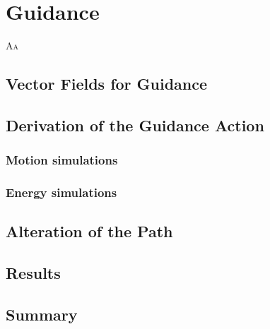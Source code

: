 
\chapter{Guidance}
\label{cp:gd}


\lettrine{A}{a}


\section{Vector Fields for Guidance}


\section{Derivation of the Guidance Action}

\subsection{Motion simulations}

\subsection{Energy simulations}


\section{Alteration of the Path}


\section{Results}


\section{Summary}

